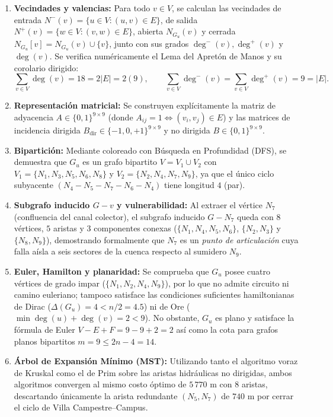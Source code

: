 \documentclass[12pt,letterpaper]{article}
\begin{document}
\begin{enumerate}[leftmargin=2.0cm]
    \item \textbf{Vecindades y valencias:} Para todo $v \in V$, se calculan las vecindades de entrada $N^-(v) = \{u \in V : (u,v) \in E\}$, de salida $N^+(v) = \{w \in V : (v,w) \in E\}$, abierta $N_{G_u}(v)$ y cerrada $N_{G_u}[v] = N_{G_u}(v) \cup \{v\}$, junto con sus grados $\deg^-(v), \deg^+(v)$ y $\deg(v)$. Se verifica numéricamente el Lema del Apretón de Manos y su corolario dirigido:
    \begin{equation}
        \sum_{v \in V} \deg(v) = 18 = 2|E| = 2(9), \qquad \sum_{v \in V} \deg^-(v) = \sum_{v \in V} \deg^+(v) = 9 = |E|.
    \end{equation}
    \item \textbf{Representación matricial:} Se construyen explícitamente la matriz de adyacencia $A \in \{0,1\}^{9 \times 9}$ (donde $A_{ij}=1 \iff (v_i, v_j) \in E$) y las matrices de incidencia dirigida $B_{\text{dir}} \in \{-1, 0, +1\}^{9 \times 9}$ y no dirigida $B \in \{0, 1\}^{9 \times 9}$.
    \item \textbf{Bipartición:} Mediante coloreado con Búsqueda en Profundidad (DFS), se demuestra que $G_u$ es un grafo bipartito $V = V_1 \cup V_2$ con $V_1 = \{N_1, N_3, N_5, N_6, N_8\}$ y $V_2 = \{N_2, N_4, N_7, N_9\}$, ya que el único ciclo subyacente $(N_4 - N_5 - N_7 - N_6 - N_4)$ tiene longitud $4$ (par).
    \item \textbf{Subgrafo inducido $G - v$ y vulnerabilidad:} Al extraer el vértice $N_7$ (confluencia del canal colector), el subgrafo inducido $G - N_7$ queda con $8$ vértices, $5$ aristas y $3$ componentes conexas ($\{N_1, N_4, N_5, N_6\}$, $\{N_2, N_3\}$ y $\{N_8, N_9\}$), demostrando formalmente que $N_7$ es un \textit{punto de articulación} cuya falla aísla a seis sectores de la cuenca respecto al sumidero $N_9$.
    \item \textbf{Euler, Hamilton y planaridad:} Se comprueba que $G_u$ posee cuatro vértices de grado impar ($\{N_1, N_2, N_4, N_9\}$), por lo que no admite circuito ni camino euleriano; tampoco satisface las condiciones suficientes hamiltonianas de Dirac ($\Delta(G_u) = 4 < n/2 = 4.5$) ni de Ore ($\min \deg(u) + \deg(v) = 2 < 9$). No obstante, $G_u$ es plano y satisface la fórmula de Euler $V - E + F = 9 - 9 + 2 = 2$ así como la cota para grafos planos bipartitos $m = 9 \le 2n - 4 = 14$.
    \item \textbf{Árbol de Expansión Mínimo (MST):} Utilizando tanto el algoritmo voraz de Kruskal como el de Prim sobre las aristas hidráulicas no dirigidas, ambos algoritmos convergen al mismo costo óptimo de $5\,770\text{ m}$ con $8$ aristas, descartando únicamente la arista redundante $(N_5, N_7)$ de $740\text{ m}$ por cerrar el ciclo de Villa Campestre--Campus.
\end{enumerate}
\end{document}
